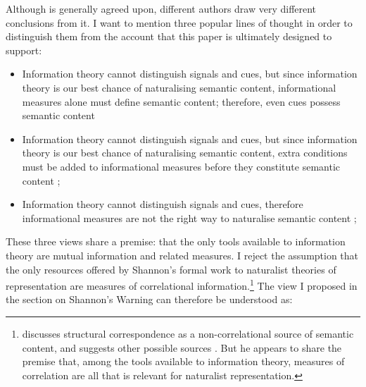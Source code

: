 


Although \ait{} is generally agreed upon, different authors draw very different conclusions from it.
I want to mention three popular lines of thought in order to distinguish them from the account that this paper is ultimately designed to support:

\begin{itemize}
    \item Information theory cannot distinguish signals and cues, but since information theory is our best chance of naturalising semantic content, informational measures alone must define semantic content; therefore, even cues possess semantic content \citep{skyrms2010signals,isaac2018semantics}
    \item Information theory cannot distinguish signals and cues, but since information theory is our best chance of naturalising semantic content, extra conditions must be added to informational measures before they constitute semantic content \citep[$\S$3-4]{shea2018representation}; \citep[pp. 6-9,34-36]{neander2017mark}
    \item Information theory cannot distinguish signals and cues, therefore informational measures are not the right way to naturalise semantic content \citep{lean2014shannon}; \citep[$\S$4]{hutto2013radicalizing} 
\end{itemize}

\noindent These three views share a premise: that the only tools available to information theory are mutual information and related measures.
I reject the assumption that the only resources offered by Shannon's formal work to naturalist theories of representation are measures of correlational information.\footnote{\citet[$\S$5]{shea2018representation} discusses structural correspondence as a non-correlational source of semantic content, and suggests other possible sources \citep[p. 76 n. 1]{shea2018representation}. But he appears to share the premise that, among the tools available to information theory, measures of correlation are all that is relevant for naturalist representation.}
The view I proposed in the section on Shannon's Warning can therefore be understood as:

